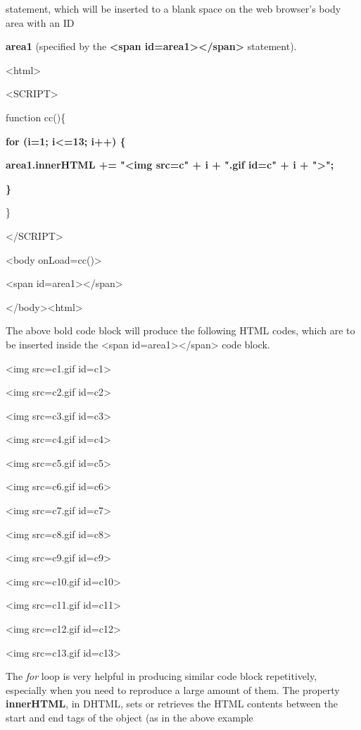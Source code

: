 \documentclass[
]{article}
\begin{document}
statement, which will be inserted to a blank space on the web browser's
body area with an ID

\textbf{area1} (specified by the \textbf{\textless span
id=area1\textgreater\textless/span\textgreater{}} statement).

\textless html\textgreater{}

\textless SCRIPT\textgreater{}

function cc()\{

\textbf{for (i=1; i\textless=13; i++) \{}

\textbf{area1.innerHTML += "\textless img src=c" + i + ".gif id=c" + i +
"\textgreater";}

\textbf{\}}

\}

\textless/SCRIPT\textgreater{}

\textless body onLoad=cc()\textgreater{}

\textless span id=area1\textgreater\textless/span\textgreater{}

\textless/body\textgreater\textless html\textgreater{}

The above bold code block will produce the following HTML codes, which
are to be inserted inside the \textless span
id=area1\textgreater\textless/span\textgreater{} code block.

\textless img src=c1.gif id=c1\textgreater{}

\textless img src=c2.gif id=c2\textgreater{}

\textless img src=c3.gif id=c3\textgreater{}

\textless img src=c4.gif id=c4\textgreater{}

\textless img src=c5.gif id=c5\textgreater{}

\textless img src=c6.gif id=c6\textgreater{}

\textless img src=c7.gif id=c7\textgreater{}

\textless img src=c8.gif id=c8\textgreater{}

\textless img src=c9.gif id=c9\textgreater{}

\textless img src=c10.gif id=c10\textgreater{}

\textless img src=c11.gif id=c11\textgreater{}

\textless img src=c12.gif id=c12\textgreater{}

\textless img src=c13.gif id=c13\textgreater{}

The \emph{for} loop is very helpful in producing similar code block
repetitively, especially when you need to reproduce a large amount of
them. The property \textbf{innerHTML}, in DHTML, sets or retrieves the
HTML contents between the start and end tags of the object (as in the
above example
\end{document}
